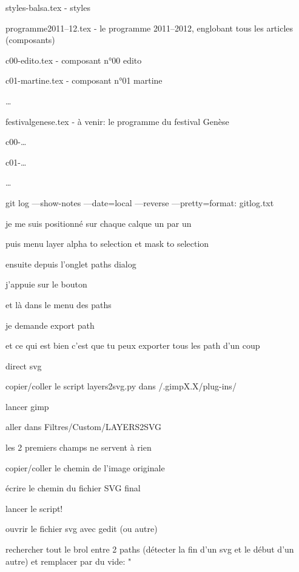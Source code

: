 \subject{CONTEXT}


\startitemize
\item
  styles-balsa.tex - styles
\item
  programme2011--12.tex - le programme 2011--2012,
  englobant tous les articles (composants)
\item
  c00-edito.tex - composant n°00 edito
\item
  c01-martine.tex - composant n°01 martine
\item
  \ldots{}
\item
  festivalgenese.tex - à venir: le
  programme du festival Genèse
\item
  c00-\ldots{}
\item
  c01-\ldots{}
\item
  \ldots{}
\stopitemize

\subject{EXPORTER LE GIT LOG}

git log ---show-notes ---date=local ---reverse
---pretty=format: 
gitlog.txt

\subject{TRANSFORMER PSD EN TRACÉS}

\startitemize
\item
  je me suis positionné sur chaque calque un par un
\item
  puis  menu layer  alpha to selection et mask
  to selection
\item
  ensuite depuis l'onglet paths dialog
\item
  \startblockquote
  j'appuie sur le bouton 
  \stopblockquote
\item
  et là dans le menu des paths
\item
  je demande export path
\item
  et ce qui est bien c'est que tu peux exporter tous les path d'un coup
\item
  direct svg
\stopitemize


\startitemize
\item
  copier/coller le script layers2svg.py dans
  /.gimpX.X/plug-ins/
\item
  lancer gimp
\item
  aller dans Filtres/Custom/LAYERS2SVG
\item
  les 2 premiers champs ne servent à rien
\item
  copier/coller le chemin de l'image originale
\item
  écrire le chemin du fichier SVG final
\item
  lancer le script!
\item
  ouvrir le fichier svg avec gedit (ou autre)
\item
  rechercher tout le brol entre 2 paths (détecter la fin d'un svg et le
  début d'un autre) et remplacer par du vide: \quotation{}"

